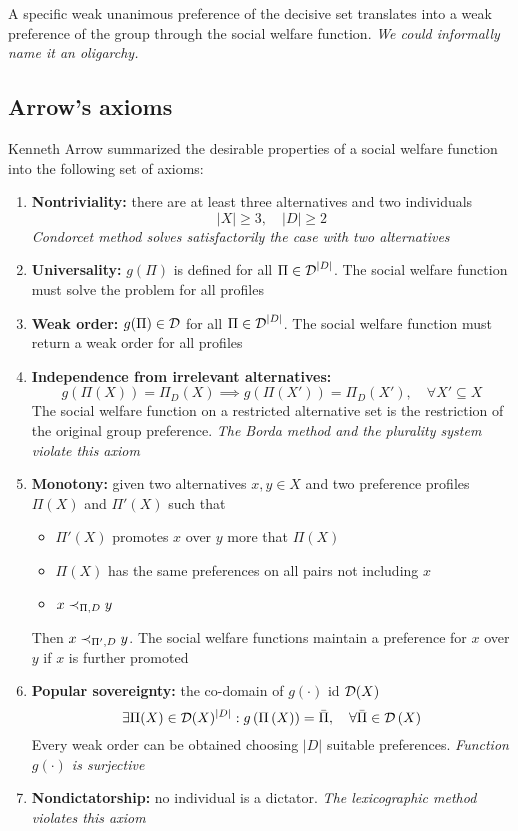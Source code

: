 A specific weak unanimous preference of the decisive set translates into a weak preference of the group through the social welfare function. \textit{We could informally name it an oligarchy.}

\subsection{Arrow's axioms}

Kenneth Arrow summarized the desirable properties of a social welfare function into the following set of axioms: 
\begin{enumerate}
	\item \textbf{Nontriviality:} there are at least three alternatives and two individuals
	$$ |X| \geq 3, \quad |D| \geq 2 $$
	\textit{Condorcet method solves satisfactorily the case with two alternatives}
	
	\item \textbf{Universality:} $g (\Pi)$ is defined for all $\Pi \in \operatorname{\mathcal{D}}^{|D|}$. The social welfare function must solve the problem for all profiles
	
	\item \textbf{Weak order:} $g(\Pi) \in \operatorname{\mathcal{D}}$ for all $\Pi \in \operatorname{\mathcal{D}}^{|D|}$. The social welfare function must return a weak order for all profiles
	
	\item \textbf{Independence from irrelevant alternatives:}
	$$ g\left(\Pi(X)\right) = \Pi_D \left(X\right) \implies g \left(\Pi \left(X'\right)\right) = \Pi_D \left(X'\right), \quad \forall X' \subseteq X$$
	The social welfare function on a restricted alternative set is the restriction of the original group preference. \textit{The Borda method and the plurality system violate this axiom}
	
	\item \textbf{Monotony:} given two alternatives $x, y \in X$ and two preference profiles $\Pi (X)$ and $\Pi' (X)$ such that
	\begin{itemize}
		\item $\Pi'(X)$ promotes $x$ over $y$ more that $\Pi (X)$
		
		\item $\Pi(X)$ has the same preferences on all pairs not including $x$
		
		\item $x \prec_{\Pi, D} y$
	\end{itemize}
	Then $x \prec_{\Pi', D} y$. The social welfare functions maintain a preference for $x$ over $y$ if $x$ is further promoted
	
	\item \textbf{Popular sovereignty:} the co-domain of $g (\cdot)$ id $\operatorname{\mathcal{D}}(X)$
	$$ \exists \Pi (X) \in \operatorname{\mathcal{D}} (X)^{|D|} : g \left(\Pi \left(X\right)\right) = \bar \Pi, \quad \forall \bar \Pi \in \operatorname{\mathcal{D}} \left(X\right) $$
	Every weak order can be obtained choosing $|D|$ suitable preferences. \textit{Function $g(\cdot)$ is surjective}
	
	\item \textbf{Nondictatorship:} no individual is a dictator. \textit{The lexicographic method violates this axiom}
\end{enumerate}

